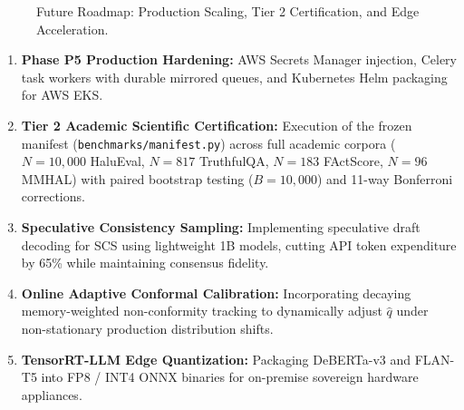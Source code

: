 \documentclass[11pt,a4paper]{article}
\begin{document}
\begin{figure}[H]
\centering
{}
\caption{Future Roadmap: Production Scaling, Tier 2 Certification, and Edge Acceleration.}
\label{fig:future_roadmap}
\end{figure}

\begin{enumerate}[leftmargin=*]
    \item \textbf{Phase P5 Production Hardening:} AWS Secrets Manager injection, Celery task workers with durable mirrored queues, and Kubernetes Helm packaging for AWS EKS.
    \item \textbf{Tier 2 Academic Scientific Certification:} Execution of the frozen manifest (\texttt{benchmarks/manifest.py}) across full academic corpora ($N=10,000$ HaluEval, $N=817$ TruthfulQA, $N=183$ FActScore, $N=96$ MMHAL) with paired bootstrap testing ($B=10,000$) and 11-way Bonferroni corrections.
    \item \textbf{Speculative Consistency Sampling:} Implementing speculative draft decoding for SCS using lightweight 1B models, cutting API token expenditure by 65\% while maintaining consensus fidelity.
    \item \textbf{Online Adaptive Conformal Calibration:} Incorporating decaying memory-weighted non-conformity tracking to dynamically adjust $\hat{q}$ under non-stationary production distribution shifts.
    \item \textbf{TensorRT-LLM Edge Quantization:} Packaging DeBERTa-v3 and FLAN-T5 into FP8 / INT4 ONNX binaries for on-premise sovereign hardware appliances.
\end{enumerate}
\end{document}
